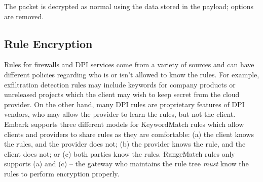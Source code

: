 \documentclass[letterpaper,twocolumn,10pt]{article}
\newcommand{\sys}{Embark\xspace} %
\providecommand{\DIFaddtex}[1]{{\protect\color{blue}\uwave{#1}}} %
\providecommand{\DIFdeltex}[1]{{\protect\color{red}\sout{#1}}}                      %
\providecommand{\DIFaddbegin}{} %
\providecommand{\DIFaddend}{} %
\providecommand{\DIFdelbegin}{} %
\providecommand{\DIFdelend}{} %
\providecommand{\DIFadd}[1]{\texorpdfstring{\DIFaddtex{#1}}{#1}} %
\providecommand{\DIFdel}[1]{\texorpdfstring{\DIFdeltex{#1}}{}} %
\begin{document}
 The packet is decrypted as normal using the data stored in the payload; \DIFaddbegin \DIFadd{IP }\DIFaddend options are removed.



\subsection{Rule Encryption}
\label{sec:rulenc}

Rules for firewalls and DPI services come from a variety of sources and can have different policies regarding who is or isn't allowed to know the rules. 
For example, exfiltration detection rules may include keywords for company products or unreleased projects which the client may wish to keep secret from the cloud provider. 
On the other hand, many DPI rules are proprietary features of DPI vendors, who may allow the provider to learn the rules, but not the client.
\sys supports three different models for KeywordMatch rules which allow clients and providers to share rules as they are comfortable: (a) the client knows the rules, and the provider does not; (b) the provider knows the rule, and the client does not; or (c) both parties know the rules.
\DIFdelbegin \DIFdel{RangeMatch }\DIFdelend \DIFaddbegin \DIFadd{PrefixMatch }\DIFaddend rules only supports (a) and (c) -- the gateway who maintains the rule tree {\it must} know the rules to perform encryption properly.
\end{document}

